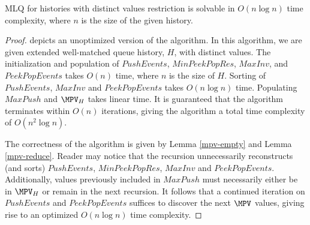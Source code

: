 \begin{theorem}
    MLQ for histories with distinct values restriction is solvable in $O(n \log{n})$ time complexity, where $n$ is the size of the given history.
\end{theorem}
\begin{proof}

 depicts an unoptimized version of the algorithm. In this algorithm, we are given extended well-matched queue history, $H$, with distinct values. The initialization and population of $PushEvents$, $MinPeekPopRes$, $MaxInv$, and $PeekPopEvents$ takes $O(n)$ time, where $n$ is the size of $H$. Sorting of $PushEvents$, $MaxInv$ and $PeekPopEvents$ takes $O(n \log{n})$ time. Populating $MaxPush$ and $\MPV_H$ takes linear time. It is guaranteed that the algorithm terminates within $O(n)$ iterations, giving the algorithm a total time complexity of $O(n^2 \log{n})$.

The correctness of the algorithm is given by Lemma \ref{mpv-empty} and Lemma \ref{mpv-reduce}. Reader may notice that the recursion unnecessarily reconstructs (and sorts) $PushEvents$, $MinPeekPopRes$, $MaxInv$ and $PeekPopEvents$. Additionally, values previously included in $MaxPush$ must necessarily either be in $\MPV_H$ or remain in the next recursion. It follows that a continued iteration on $PushEvents$ and $PeekPopEvents$ suffices to discover the next $\MPV$ values, giving rise to an optimized $O(n \log{n})$ time complexity.
\end{proof}
